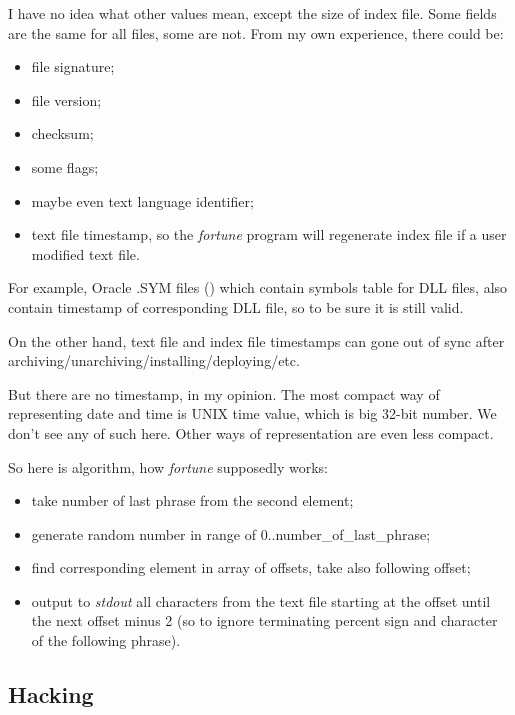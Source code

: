 \begin{figure}[H]
\centering
{}
\end{figure}

I have no idea what other values mean, except the size of index file.
Some fields are the same for all files, some are not.
From my own experience, there could be:

\begin{itemize}
\item file signature;
\item file version;
\item checksum;
\item some flags;
\item maybe even text language identifier;
\item text file timestamp, so the \emph{fortune} program will regenerate index file if a user modified text file.
\end{itemize}

For example, Oracle .SYM files () which contain symbols table for DLL files, also contain timestamp of corresponding DLL file, so to be sure it is still valid.

On the other hand, text file and index file timestamps can gone out of sync after archiving/unarchiving/installing/deploying/etc.

But there are no timestamp, in my opinion. The most compact way of representing date and time is UNIX time value, which is big 32-bit number. We don't see any of such here. Other ways of representation are even less compact.

So here is algorithm, how \emph{fortune} supposedly works:

\begin{itemize}
\item take number of last phrase from the second element;
\item generate random number in range of 0..number\_of\_last\_phrase;
\item find corresponding element in array of offsets, take also following offset;
\item output to \emph{stdout} all characters from the text file starting at the offset until
the next offset minus 2 (so to ignore terminating percent sign 
and character of the following phrase).
\end{itemize}

\subsection{Hacking}

